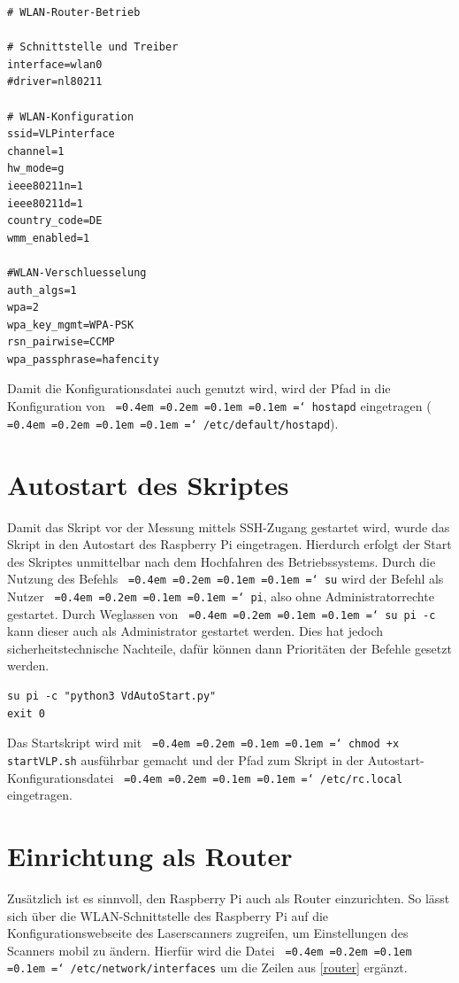 \documentclass[a4paper,12pt,bibliography=totoc, listof=totoc,titlepage,pointlessnumbers]{scrreprt}
\newcommand*\justify{%
  \fontdimen2\font=0.4em%
  \fontdimen3\font=0.2em%
  \fontdimen4\font=0.1em%
  \fontdimen7\font=0.1em%
  \hyphenchar\font=`\-%
}
\newcommand{\code}[1]{\texttt{\justify{#1}}}
\begin{document}
\begin{lstlisting}[caption={Konfiguration der \code{/etc/hostapd/hostapd.conf}}, label={hostapd}]
# WLAN-Router-Betrieb

# Schnittstelle und Treiber
interface=wlan0
#driver=nl80211

# WLAN-Konfiguration
ssid=VLPinterface
channel=1
hw_mode=g
ieee80211n=1
ieee80211d=1
country_code=DE
wmm_enabled=1

#WLAN-Verschluesselung
auth_algs=1
wpa=2
wpa_key_mgmt=WPA-PSK
rsn_pairwise=CCMP
wpa_passphrase=hafencity
\end{lstlisting}

Damit die Konfigurationsdatei auch genutzt wird, wird der Pfad in die Konfiguration von \code{hostapd} eingetragen (\code{/etc/default/hostapd}).


\section{Autostart des Skriptes}
Damit das Skript vor der Messung mittels SSH-Zugang gestartet wird, wurde das Skript in den Autostart des Rasp\-berry Pi eingetragen. Hierdurch erfolgt der Start des Skriptes unmittelbar nach dem Hochfahren des Betriebssystems. Durch die Nutzung des Befehls \code{su} wird der Befehl als Nutzer \code{pi}, also ohne Administratorrechte gestartet. Durch Weglassen von \code{su pi -c} kann dieser auch als Administrator gestartet werden. Dies hat jedoch sicherheitstechnische Nachteile, dafür können dann Prioritäten der Befehle gesetzt werden.

\begin{lstlisting}[caption={Startskript startVLP.sh}, label={startskript}]
su pi -c "python3 VdAutoStart.py"
exit 0
\end{lstlisting}

Das Startskript wird mit \code{chmod +x startVLP.sh} ausführbar gemacht und der Pfad zum Skript in der Autostart-Konfigurationsdatei \code{/etc/rc.local} eingetragen.

\section{Einrichtung als Router}
Zusätzlich ist es sinnvoll, den Rasp\-berry Pi auch als Router einzurichten. So lässt sich über die WLAN-Schnittstelle des Rasp\-berry Pi auf die Konfigurationswebseite des Laser\-scan\-ners zugreifen, um Einstellungen des Scanners mobil zu ändern. Hierfür wird die Datei \code{/etc/network/interfaces} um die Zeilen aus \autoref{router} ergänzt. \citep{ekRaspRouter}
\end{document}
